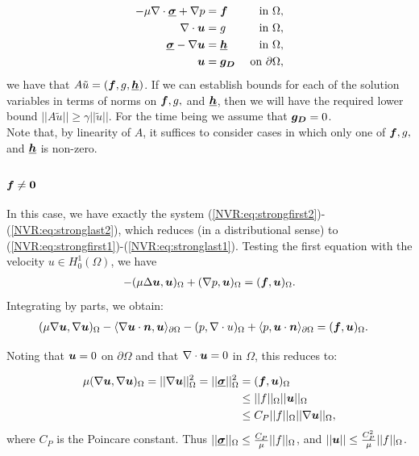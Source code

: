 \begin{align}
- \mu \NVRdiv \NVRtensor{\sigma} + \NVRgrad p &= \vect{f} & \text{ in } \Omega, \label{NVR:eq:strongfirst3} \\
\NVRdiv \vect{u} &= g & \text{ in } \Omega, \\
\NVRtensor{\sigma} - \NVRgrad \vect{u} &= \NVRtensor{h} & \text{ in } \Omega, \label{NVR:eq:strongsecondtolast3} \\
\vect{u} &= \vect{g_{D}} & \text{ on } \partial\Omega,\label{NVR:eq:stronglast3}
\end{align}
we have that $A \tilde{u} = (\vect{f},g,\NVRtensor{h})$.  If we can establish bounds for each of the solution variables in terms of norms on $\vect{f},g,$ and $\NVRtensor{h}$, then we will have the required lower bound $|| A \tilde{u} || \geq \gamma || \tilde{u} ||$.  For the time being we assume that $\vect{g_{D}} = 0$.\\

Note that, by linearity of $A$, it suffices to consider cases in which only one of $\vect{f},g,$ and $\NVRtensor{h}$ is non-zero.\\

\subsubsection{$\vect{f} \neq \vect{0}$}
In this case, we have exactly the system (\ref{NVR:eq:strongfirst2})-(\ref{NVR:eq:stronglast2}), which reduces (in a distributional sense) to (\ref{NVR:eq:strongfirst1})-(\ref{NVR:eq:stronglast1}).  Testing the first equation with the velocity $u \in H^{1}_{0}(\Omega)$, we have
\begin{align*}
- (\mu \Delta \vect{u}, \vect{u})_{\Omega} + (\NVRgrad p, \vect{u})_{\Omega} &= (\vect{f},\vect{u})_{\Omega}.\\
\end{align*}
Integrating by parts, we obtain:
\begin{align*}
(\mu \NVRgrad \vect{u}, \NVRgrad \vect{u})_{\Omega} - \langle \NVRgrad \vect{u} \cdot \vect{n}, \vect{u} \rangle_{\partial \Omega} - (p, \NVRdiv u)_{\Omega} + \langle p, \vect{u} \cdot \vect{n} \rangle_{\partial \Omega} &= (\vect{f},\vect{u})_{\Omega}.
\end{align*}

Noting that $\vect{u} = 0$ on $\partial \Omega$ and that $\NVRdiv \vect{u} = 0 $ in $\Omega$, this reduces to:

\begin{align*}
\mu (\NVRgrad \vect{u}, \NVRgrad \vect{u})_{\Omega} = ||\NVRgrad \vect{u}||^{2}_{\Omega} = || \NVRtensor{ \sigma }||^{2}_{\Omega} &= (\vect{f},\vect{u})_{\Omega} \\
&\leq || f ||_{\Omega} || \vect{u} ||_{\Omega}\\
&\leq C_{P} || f ||_{\Omega} || \NVRgrad \vect{u} ||_{\Omega},
\end{align*}
where $C_{P}$ is the Poincare constant.  Thus $ || \NVRtensor{ \sigma }||_{\Omega} \leq \frac{C_{P}}{\mu} || f ||_{\Omega}$, and $|| \vect{u} || \leq \frac{C_{P}^{2}}{\mu} || f ||_{\Omega}$.

